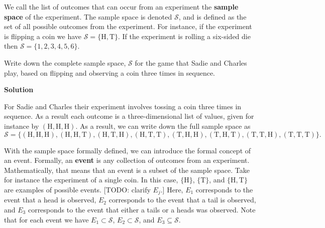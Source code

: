\documentclass[
  letterpaper,
  DIV=11,
  numbers=noendperiod]{scrreprt}
\begin{document}
We call the list of outcomes that can occur from an experiment the
\textbf{sample space} of the experiment. The sample space is denoted
\(\mathcal{S}\), and is defined as the set of all possible outcomes from
the experiment. For instance, if the experiment is flipping a coin we
have \(\mathcal{S} = \{\text{H}, \text{T}\}\). If the experiment is
rolling a six-sided die then \(\mathcal{S} = \{1,2,3,4,5,6\}\).

\begin{tcolorbox}[enhanced jigsaw, toptitle=1mm, arc=.35mm, title={{\faIcon{question-circle}} Example: Enumerating Sample Spaces}, opacitybacktitle=0.6, colbacktitle=quarto-callout-tip-color!10!white, coltitle=black, breakable, bottomrule=.15mm, opacityback=0, colframe=quarto-callout-tip-color-frame, bottomtitle=1mm, titlerule=0mm, rightrule=.15mm, toprule=.15mm, left=2mm, leftrule=.75mm, colback=white]

{Write down the complete sample space, \(\mathcal{S}\) for the game that
Sadie and Charles play, based on flipping and observing a coin three
times in sequence.}

\begin{tcolorbox}[enhanced jigsaw, toprule=.15mm, breakable, bottomrule=.15mm, arc=.35mm, opacityback=0, colback=white, rightrule=.15mm, left=2mm, leftrule=.75mm]

\vspace{-3mm}\textbf{Solution}\vspace{3mm}

For Sadie and Charles their experiment involves tossing a coin three
times in sequence. As a result each outcome is a three-dimensional list
of values, given for instance by \((\text{H},\text{H},\text{H})\). As a
result, we can write down the full sample space as
\[\mathcal{S} = \{(\text{H},\text{H},\text{H}), (\text{H},\text{H},\text{T}), (\text{H},\text{T},\text{H}), (\text{H},\text{T},\text{T}), (\text{T},\text{H},\text{H}), (\text{T},\text{H},\text{T}), (\text{T},\text{T},\text{H}), (\text{T},\text{T},\text{T})\}.\]

\end{tcolorbox}

\end{tcolorbox}

With the sample space formally defined, we can introduce the formal
concept of an event. Formally, an \textbf{event} is any collection of
outcomes from an experiment. Mathematically, that means that an event is
a subset of the sample space. Take for instance the experiment of a
single coin. In this case, \(\{\text{H}\}\), \(\{\text{T}\}\), and
\(\{\text{H},\text{T}\}\) are examples of possible events. {[}TODO:
clarify \(E_j\).{]} Here, \(E_1\) corresponds to the event that a head
is observed, \(E_2\) corresponds to the event that a tail is observed,
and \(E_3\) corresponds to the event that either a tails or a heads was
observed. Note that for each event we have \(E_1 \subset \mathcal{S}\),
\(E_2 \subset \mathcal{S}\), and \(E_3 \subseteq \mathcal{S}\).
\end{document}

